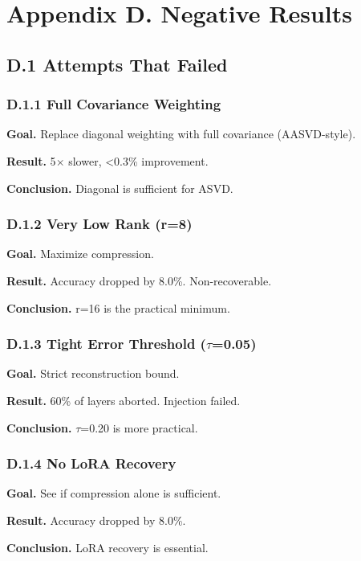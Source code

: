 
\section{Appendix D. Negative Results}

\subsection{D.1 Attempts That Failed}

\subsubsection{D.1.1 Full Covariance Weighting}

\textbf{Goal.} Replace diagonal weighting with full covariance (AASVD-style).

\textbf{Result.} 5$\times$ slower, \textless{}0.3\% improvement.

\textbf{Conclusion.} Diagonal is sufficient for ASVD.

\subsubsection{D.1.2 Very Low Rank (r=8)}

\textbf{Goal.} Maximize compression.

\textbf{Result.} Accuracy dropped by 8.0\%. Non-recoverable.

\textbf{Conclusion.} r=16 is the practical minimum.

\subsubsection{D.1.3 Tight Error Threshold ($\tau$=0.05)}

\textbf{Goal.} Strict reconstruction bound.

\textbf{Result.} 60\% of layers aborted. Injection failed.

\textbf{Conclusion.} $\tau$=0.20 is more practical.

\subsubsection{D.1.4 No LoRA Recovery}

\textbf{Goal.} See if compression alone is sufficient.

\textbf{Result.} Accuracy dropped by 8.0\%.

\textbf{Conclusion.} LoRA recovery is essential.

